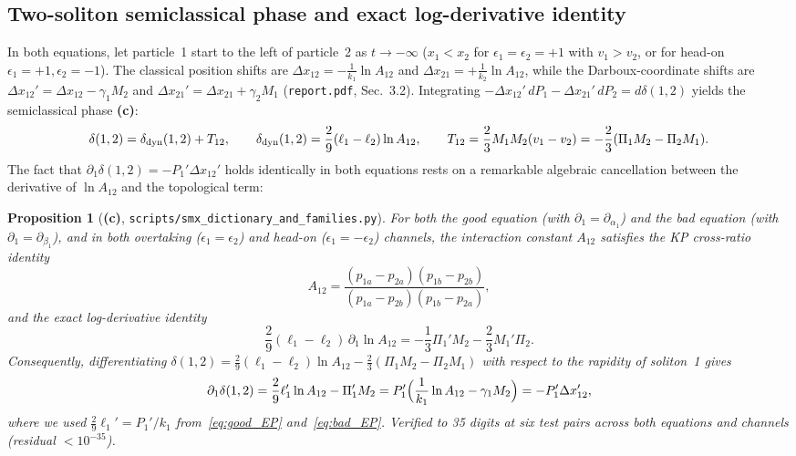 \documentclass[11pt,a4paper]{article}
\newcommand{\Lc}{\textsf{\textbf{(c)}}}
\newcommand{\script}[1]{\texttt{scripts/\allowbreak #1}}
\newtheorem{proposition}{Proposition}[section]
\theoremstyle{remark}
\begin{document}
\subsection{Two-soliton semiclassical phase and exact log-derivative identity}
In both equations, let particle~1 start to the left of particle~2 as $t\to-\infty$ ($x_1<x_2$ for $\epsilon_1=\epsilon_2=+1$ with $v_1>v_2$, or for head-on $\epsilon_1=+1,\epsilon_2=-1$). The classical position shifts are $\Delta x_{12}=-\frac{1}{k_1}\ln A_{12}$ and $\Delta x_{21}=+\frac{1}{k_2}\ln A_{12}$, while the Darboux-coordinate shifts are $\Delta x_{12}'=\Delta x_{12}-\gamma_1 M_2$ and $\Delta x_{21}'=\Delta x_{21}+\gamma_2 M_1$ (\texttt{report.pdf}, Sec.~3.2). Integrating $-\Delta x_{12}'\,dP_1-\Delta x_{21}'\,dP_2=d\delta(1,2)$ yields the semiclassical phase \Lc:
\begin{equation}\label{eq:delta0}
\delta(1,2)=\delta_{\rm dyn}(1,2)+T_{12},\qquad
\delta_{\rm dyn}(1,2)=\frac29(\ell_1-\ell_2)\ln A_{12},\qquad
T_{12}=\frac23 M_1 M_2(v_1-v_2)=-\frac23(\Pi_1 M_2-\Pi_2 M_1).
\end{equation}
The fact that $\partial_1\delta(1,2)=-P_1'\Delta x_{12}'$ holds identically in both equations rests on a remarkable algebraic cancellation between the derivative of $\ln A_{12}$ and the topological term:

\begin{proposition}[\Lc, \script{smx\_dictionary\_and\_families.py}]\label{prop:logA_id}
For both the good equation (with $\partial_1=\partial_{\alpha_1}$) and the bad equation (with $\partial_1=\partial_{\beta_1}$), and in both overtaking ($\epsilon_1=\epsilon_2$) and head-on ($\epsilon_1=-\epsilon_2$) channels, the interaction constant $A_{12}$ satisfies the KP cross-ratio identity
\begin{equation}\label{eq:KP_cr}
A_{12}=\frac{(p_{1a}-p_{2a})(p_{1b}-p_{2b})}{(p_{1a}-p_{2b})(p_{1b}-p_{2a})},
\end{equation}
and the exact log-derivative identity
\begin{equation}\label{eq:logA_id}
\frac29(\ell_1-\ell_2)\,\partial_1\ln A_{12}=-\frac13\Pi_1' M_2-\frac23 M_1'\Pi_2.
\end{equation}
Consequently, differentiating $\delta(1,2)=\frac29(\ell_1-\ell_2)\ln A_{12}-\frac23(\Pi_1 M_2-\Pi_2 M_1)$ with respect to the rapidity of soliton~1 gives
\begin{equation}\label{eq:ddelta_d1}
\partial_1\delta(1,2)=\frac29\ell_1'\ln A_{12}-\Pi_1' M_2=P_1'\Bigl(\frac{1}{k_1}\ln A_{12}-\gamma_1 M_2\Bigr)=-P_1'\Delta x_{12}',
\end{equation}
where we used $\frac29\ell_1'=P_1'/k_1$ from~\eqref{eq:good_EP} and~\eqref{eq:bad_EP}. Verified to 35 digits at six test pairs across both equations and channels (residual $<10^{-35}$).
\end{proposition}
\end{document}
